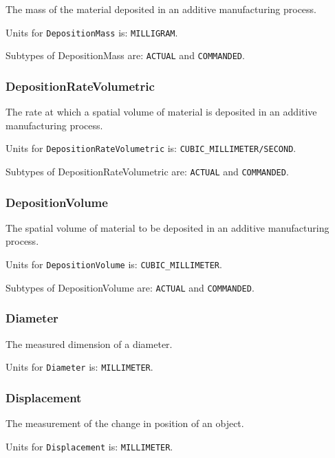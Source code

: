 The mass of the material deposited in an additive manufacturing process.


Units for \texttt{DepositionMass} is: \texttt{MILLIGRAM}.


Subtypes of DepositionMass are: \texttt{ACTUAL} and \texttt{COMMANDED}. 
\FloatBarrier

\subsubsection{DepositionRateVolumetric}
  \label{sec:DepositionRateVolumetric}


The rate at which a spatial volume of material is deposited in an additive manufacturing process.


Units for \texttt{DepositionRateVolumetric} is: \texttt{CUBIC_MILLIMETER/SECOND}.


Subtypes of DepositionRateVolumetric are: \texttt{ACTUAL} and \texttt{COMMANDED}. 
\FloatBarrier

\subsubsection{DepositionVolume}
  \label{sec:DepositionVolume}


The spatial volume of material to be deposited in an additive manufacturing process.


Units for \texttt{DepositionVolume} is: \texttt{CUBIC_MILLIMETER}.


Subtypes of DepositionVolume are: \texttt{ACTUAL} and \texttt{COMMANDED}. 
\FloatBarrier

\subsubsection{Diameter}
  \label{sec:Diameter}


The measured dimension of a diameter.


Units for \texttt{Diameter} is: \texttt{MILLIMETER}.

\FloatBarrier

\subsubsection{Displacement}
  \label{sec:Displacement}


The measurement of the change in position of an object.


Units for \texttt{Displacement} is: \texttt{MILLIMETER}.

\FloatBarrier

